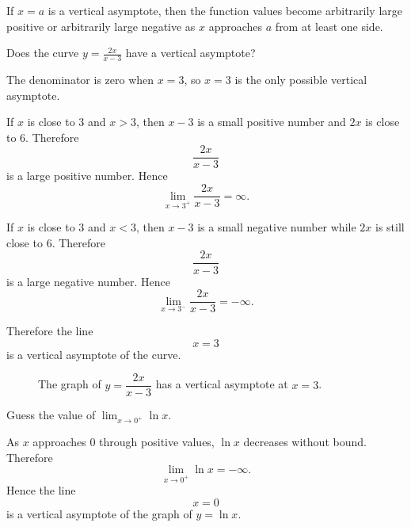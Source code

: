 \begin{remark}
If \(x=a\) is a vertical asymptote, then the function values become arbitrarily large positive or arbitrarily large negative as \(x\) approaches \(a\) from at least one side.
\end{remark}

\begin{example}
Does the curve
\(\displaystyle
y=\frac{2x}{x-3}
\)
have a vertical asymptote?
\end{example}

\begin{solution}
The denominator is zero when \(x=3\), so \(x=3\) is the only possible vertical asymptote.

If \(x\) is close to \(3\) and \(x>3\), then \(x-3\) is a small positive number and \(2x\) is close to \(6\). Therefore
\[
\frac{2x}{x-3}
\]
is a large positive number. Hence
\[
\lim_{x\to 3^+}\frac{2x}{x-3}=\infty.
\]

If \(x\) is close to \(3\) and \(x<3\), then \(x-3\) is a small negative number while \(2x\) is still close to \(6\). Therefore
\[
\frac{2x}{x-3}
\]
is a large negative number. Hence
\[
\lim_{x\to 3^-}\frac{2x}{x-3}=-\infty.
\]

Therefore the line
\[
x=3
\]
is a vertical asymptote of the curve.
\end{solution}

\begin{figure}[tbp]
\centering
{}
\caption{The graph of \(y=\dfrac{2x}{x-3}\) has a vertical asymptote at \(x=3\).}
\label{fig:vertical-asymptote-example}
\end{figure}

\begin{example}
Guess the value of \(\displaystyle \lim_{x\to 0^+}\ln x\).
\end{example}

\begin{solution}
As \(x\) approaches \(0\) through positive values, \(\ln x\) decreases without bound. Therefore
\[
\lim_{x\to 0^+}\ln x=-\infty.
\]
Hence the line
\[
x=0
\]
is a vertical asymptote of the graph of \(y=\ln x\).
\end{solution}

